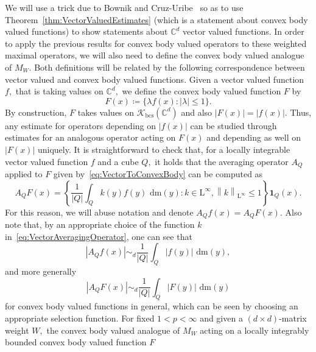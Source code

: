 \documentclass{article}
\theoremstyle{definition}
\theoremstyle{remark}
\numberwithin{equation}{section}
\newcommand{\norm}[2]{\left\|{#1}\right\|_{{#2}}}
\newcommand{\mathdm}{\,\mathrm{dm}}
\newcommand{\cK}{\mathcal{K}}
\newcommand{\complex}{\mathbb{C}}
\newcommand{\convex}{\cK_{\mathrm{bcs}}}
\newcommand{\Lp}[1]{\mathrm{L}^{#1}}
\newcommand{\1}{\mathbf{1}}
\begin{document}
    We will use a trick due to Bownik and Cruz-Uribe~\cite{Cruz_Uribe_Bownik_Extrapolation} so as to use
    Theorem~\ref{thm:VectorValuedEstimates} (which is a statement about convex body valued functions)
    to show statements about $\complex^d$ vector valued functions.
    In order to apply the previous results for convex body valued operators to these weighted maximal operators,
    we will also need to define the convex body valued analogue of $M_W.$
    Both definitions will be related by the following correspondence between vector valued and convex body valued functions.
    Given a vector valued function $f,$ that is taking values on $\complex^d,$
    we define the convex body valued function $F$ by
    \begin{equation}
        \label{eq:VectorToConvexBody}
        F(x) \coloneq \{\lambda f(x)\colon |\lambda| \leq 1\}.
    \end{equation}
    By construction, $F$ takes values on $\convex(\complex^d)$ and also $|F(x)| = |f(x)|.$
    Thus, any estimate for operators depending on $|f(x)|$ can be studied through
    estimates for an analogous operator acting on $F(x)$ and depending as well on $|F(x)|$ uniquely.
    It is straightforward to check that, for a locally integrable vector valued function $f$ and a cube $Q,$
    it holds that the averaging operator $A_Q$ applied to $F$ given by~\eqref{eq:VectorToConvexBody} can be computed as
    \begin{equation}
        \label{eq:VectorAveragingOperator}
        A_Q F(x) = \left\{\frac{1}{|Q|} \int_Q k(y)f(y)\, \mathdm(y)\colon k \in \Lp{\infty}, \norm{k}{\Lp{\infty}} \leq 1\right\} \1_Q(x).
    \end{equation}
    For this reason, we will abuse notation and denote $A_Q f(x) = A_Q F(x).$
    Also note that, by an appropriate choice of the function $k$ in~\eqref{eq:VectorAveragingOperator}, one can see that
    \begin{equation}
        \label{eq:AveragingModulusEquivalence}
        |A_Q f(x)| \sim_d \frac{1}{|Q|} \int_Q |f(y)|\, \mathdm(y),
    \end{equation}
    and more generally
    \begin{equation*}
        |A_Q F(x)| \sim_d \frac{1}{|Q|} \int_Q |F(y)|\, \mathdm(y)
    \end{equation*}
    for convex body valued functions in general, which can be seen by choosing an appropriate selection function.
    For fixed $1 < p < \infty$ and given a $(d \times d)$-matrix weight $W,$
    the convex body valued analogue of $M_W$ acting on a locally integrably bounded convex body valued function $F$
\end{document}
